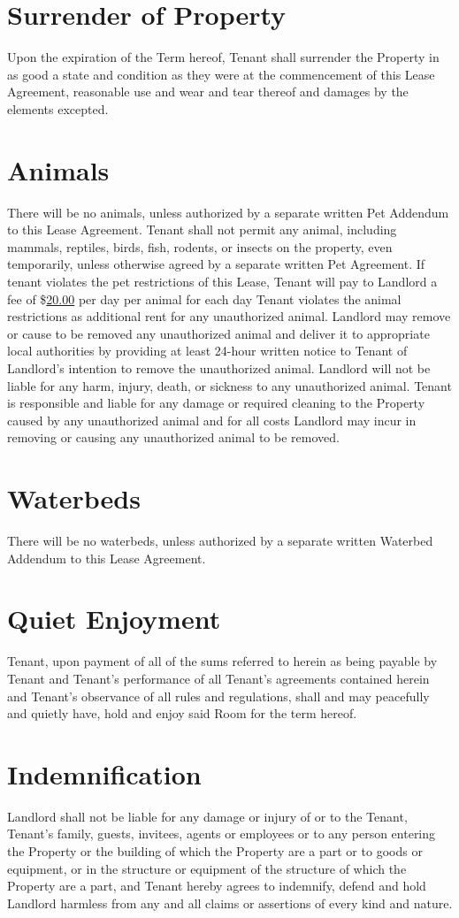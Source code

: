\documentclass{amsart}
\begin{document}
\section{Surrender of Property}
Upon the expiration of the Term hereof, Tenant shall surrender the
Property in as good a state and condition as they were at the commencement of this 
Lease Agreement, reasonable use and wear and tear thereof and damages by the elements
excepted.
\section{Animals}
There will be no animals, unless authorized by a separate written Pet Addendum
to this Lease Agreement. Tenant shall not permit any animal, including mammals,
reptiles, birds, fish, rodents, or insects on the property, even temporarily,
unless otherwise agreed by a separate written Pet Agreement. If tenant violates
the pet restrictions of this Lease, Tenant will pay to Landlord a fee of
\$\underline{20.00} per day per animal for each day Tenant violates the animal
restrictions as additional rent for any unauthorized animal.  Landlord may
remove or cause to be removed any unauthorized animal and deliver it to
appropriate local authorities by providing at least 24-hour written notice to
Tenant of Landlord's intention to remove the unauthorized animal. Landlord will
not be liable for any harm, injury, death, or sickness to any unauthorized
animal. Tenant is responsible and liable for any damage or required cleaning to
the Property caused by any unauthorized animal and for all costs Landlord may
incur in removing or causing any unauthorized animal to be removed.
\section{Waterbeds}
There will be no waterbeds, unless authorized by a separate written Waterbed
Addendum to this Lease Agreement.
\section{Quiet Enjoyment}
Tenant, upon payment of all of the sums referred to herein as being payable by
Tenant and Tenant's performance of all Tenant's agreements contained herein and
Tenant's observance of all rules and regulations, shall and may peacefully and
quietly have, hold and enjoy said Room for the term hereof.
\section{Indemnification}
Landlord shall not be liable for any damage or injury of or to the Tenant,
Tenant's family, guests, invitees, agents or employees or to any person entering
the Property or the building of which the Property are a part or to goods or
equipment, or in the structure or equipment of the structure of which the
Property are a part, and Tenant hereby agrees to indemnify, defend and hold
Landlord harmless from any and all claims or assertions of every kind and
nature.
\end{document}

